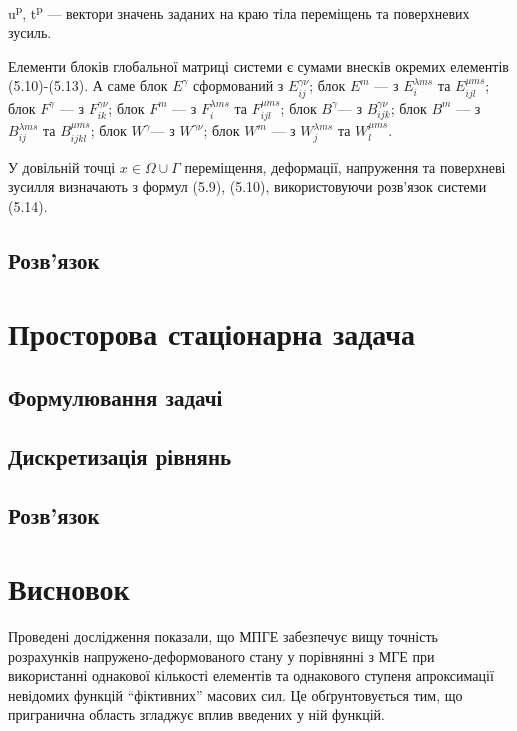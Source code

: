 u\textsuperscript{p}, t\textsuperscript{p} --- вектори значень заданих на краю тіла переміщень та поверхневих зусиль.

Елементи блоків глобальної матриці системи є сумами внесків окремих елементів (5.10)-(5.13). А саме блок $E^\gamma$
сформований з $E_{ij}^{\gamma \nu}$; блок $E^m$ --- з $E_{i}^{\lambda ms}$ та $E_{ijl}^{\mu ms}$; блок $F^\gamma$ --- з
$F_{ik}^{\gamma \nu}$; блок $F^m$ --- з $F_{i}^{\lambda ms}$ та $F_{ijl}^{\mu ms}$; блок $B^{\gamma}$--- з
$B_{\mathit{\text{ijk}}}^{\gamma \nu}$; блок $B^m$ --- з $B_{ij}^{\lambda ms}$ та $B_{ijkl}^{\mu ms}$; блок
$W^{\gamma}$--- з $W^{\gamma \nu}$; блок $W^{m}$ --- з $W_{j}^{\lambda ms}$ та $W_{l}^{\mu ms}$.

У довільній точці $x \in \Omega \cup \Gamma$ переміщення, деформації, напруження та поверх­неві зусилля визначають з
формул (5.9), (5.10), використовуючи розв'язок системи (5.14).

\subsection{Розв'язок}

\section{Просторова стаціонарна задача}

\subsection{Формулювання задачі}

\subsection{Дискретизація рівнянь}

\subsection{Розв'язок}

\section{Висновок}

Проведені дослідження показали, що МПГЕ забезпечує вищу точність розрахунків напружено-деформованого стану у
порівнянні з МГЕ при використанні однакової кількості елементів та однакового ступеня апроксимації невідомих функцій
``фіктивних'' масових сил. Це обґрунтовується тим, що пригранична область згладжує вплив введених у ній функцій.

